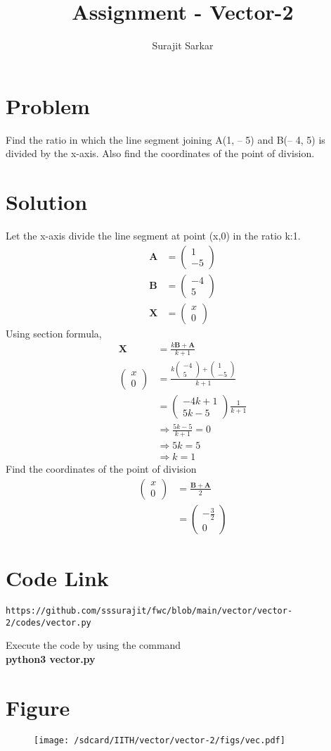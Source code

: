 \documentclass[journal,12pt,twocolumn]{IEEEtran}
\title{\mytitle}
\title{
Assignment - Vector-2
}
\author{Surajit Sarkar}
\newcommand{\myvec}[1]{\ensuremath{\begin{pmatrix}#1\end{pmatrix}}}
\let\vec\mathbf
\begin{document}
\maketitle
\tableofcontents
\bigskip
\section{\textbf{Problem}}
Find the ratio in which the line segment joining A(1, – 5) and B(– 4, 5) is divided by the
x-axis. Also find the coordinates of the point of division.
\section{\textbf{Solution}}
Let the x-axis divide the line segment at point (x,0) in the ratio k:1.
\begin{align}
\vec{A}&=\myvec{1 \\ -5} \\ 
\vec{B}&=\myvec{-4 \\ 5} \\ 
\vec{X}&=\myvec{x\\0}
\end{align}
Using section formula,
\begin{align}
\vec{X}&=\frac{k\vec{B}+\vec{A}}{k+1}\\
\myvec{x\\0}&=\frac{k\myvec{-4\\5}+\myvec{1\\-5}}{k+1}\\
&=\myvec{-4k+1\\5k-5}\frac{1}{k+1}\\
&\Rightarrow \frac{5k-5}{k+1}=0\\
&\Rightarrow 5k=5\\
&\Rightarrow k=1
\end{align}
Find the coordinates of the point of division
\begin{align}
    \myvec{x\\0}&=\frac{\vec{B}+\vec{A}}{2}\\
    &=\myvec{-\frac{3}{2}\\0}
\end{align}
\section{\textbf{Code Link}}
\begin{lstlisting}
https://github.com/sssurajit/fwc/blob/main/vector/vector-2/codes/vector.py
\end{lstlisting}
Execute the code by using the command\\
\textbf{python3 vector.py}
\section{\textbf{Figure}}
\begin{figure}[!h]
\centering
\texttt{[image: /sdcard/IITH/vector/vector-2/figs/vec.pdf]}
\caption{}
\label{fig:vec}
\end{figure}
\end{document}
